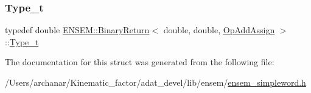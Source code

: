 \mbox{\label{structENSEM_1_1BinaryReturn_3_01double_00_01double_00_01OpAddAssign_01_4_a9b6757965dc033c66ff45da5c69ea6cc}} 
\subsubsection{\texorpdfstring{Type\_t}{Type\_t}\hspace{0.1cm}{\footnotesize\ttfamily [2/2]}}
{\footnotesize\ttfamily typedef double \mbox{\hyperlink{structENSEM_1_1BinaryReturn}{E\+N\+S\+E\+M\+::\+Binary\+Return}}$<$ double, double, \mbox{\hyperlink{structENSEM_1_1OpAddAssign}{Op\+Add\+Assign}} $>$\+::\mbox{\hyperlink{structENSEM_1_1BinaryReturn_3_01double_00_01double_00_01OpAddAssign_01_4_a9b6757965dc033c66ff45da5c69ea6cc}{Type\+\_\+t}}}



The documentation for this struct was generated from the following file\+:\begin{DoxyCompactItemize}
\item 
/\+Users/archanar/\+Kinematic\+\_\+factor/adat\+\_\+devel/lib/ensem/\mbox{\hyperlink{lib_2ensem_2ensem__simpleword_8h}{ensem\+\_\+simpleword.\+h}}\end{DoxyCompactItemize}
